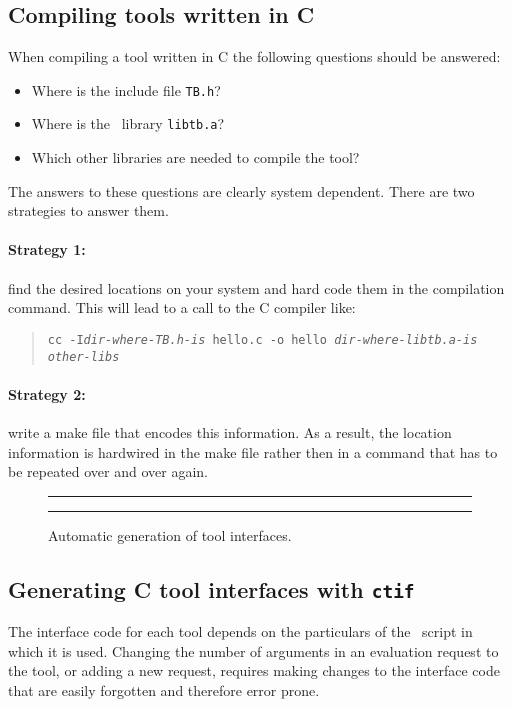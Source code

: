 \subsection{Compiling tools written in C}
When compiling a tool written in C the following questions
should be answered:
\begin{itemize}
\item Where is the include file {\tt TB.h}?
\item Where is the \TB\ library {\tt libtb.a}?
\item Which other libraries are needed to compile the tool?
\end{itemize}

The answers to these questions are clearly system dependent.
There are two strategies to answer them.

\paragraph{Strategy 1:} find the desired locations on your system and hard code them in
the compilation command. This will lead to a call to the C compiler
like:
\begin{quote}
{\tt cc -I{\em dir-where-TB.h-is} hello.c -o hello {\em dir-where-libtb.a-is} {\em other-libs}}
\end{quote}

\paragraph{Strategy 2:}  write a make file that encodes this information.
As a result, the location information is hardwired in the make file
rather then in a command that has to be repeated over and over again.

\begin{figure}
\rule{\textwidth}{0.5mm}
    
  \centerline{\box\graph}
  \caption{Automatic generation of tool interfaces.}
  \label{fig:Tifs}
\rule{\textwidth}{0.5mm}
\end{figure}

\subsection{\label{ctif}Generating C tool interfaces with {\tt ctif}}

The interface code for each tool depends on the particulars
of the \T\ script in which it is used. Changing the number
of arguments in an evaluation request to the tool,
or adding a new request, requires making changes to the interface
code that are easily forgotten and therefore error prone.

